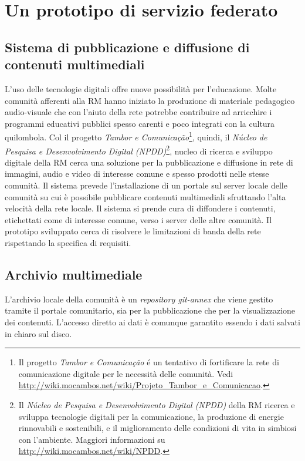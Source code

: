 
\chapter{Un prototipo di servizio federato}
\label{Capitolo3}

\section{Sistema di pubblicazione e diffusione di contenuti
  multimediali}
L'uso delle tecnologie digitali offre nuove possibilità per
l'educazione. Molte comunità afferenti alla RM hanno iniziato la
produzione di materiale pedagogico audio-visuale che con l'aiuto della
rete potrebbe contribuire ad arricchire i programmi educativi pubblici
spesso carenti e poco integrati con la cultura quilombola. Col il
progetto \emph{Tambor e Comunicação}\footnote{Il progetto \emph{Tambor
    e Comunicação} é un tentativo di fortificare la rete di
  comunicazione digitale per le necessità delle comunità. Vedi
  \url{http://wiki.mocambos.net/wiki/Projeto_Tambor_e_Comunicacao}.},
quindi, il \emph{Núcleo de Pesquisa e Desenvolvimento Digital
  (NPDD)}\footnote{Il \emph{Núcleo de Pesquisa e Desenvolvimento
    Digital (NPDD)} della RM ricerca e sviluppa tecnologie digitali
  per la comunicazione, la produzione di energie rinnovabili e
  sostenibili, e il miglioramento delle condizioni di vita in simbiosi
  con l'ambiente. Maggiori informazioni su
  \url{http://wiki.mocambos.net/wiki/NPDD}.}, nucleo di ricerca e
sviluppo digitale della RM cerca una soluzione per la pubblicazione e
diffusione in rete di immagini, audio e video di interesse comune e
spesso prodotti nelle stesse comunità. Il sistema prevede
l'installazione di un portale sul server locale delle comunità su cui
è possibile pubblicare contenuti multimediali sfruttando l'alta
velocità della rete locale. Il sistema si prende cura di diffondere i
contenuti, etichettati come di interesse comune, verso i server delle
altre comunità. Il prototipo sviluppato cerca di risolvere le
limitazioni di banda della rete rispettando la specifica di requisiti.

\section{Archivio multimediale}
L'archivio locale della comunità è un \emph{repository git-annex} che
viene gestito tramite il portale comunitario, sia per la pubblicazione
che per la visualizzazione dei contenuti. L'accesso diretto ai dati è
comunque garantito essendo i dati salvati in chiaro sul disco.

